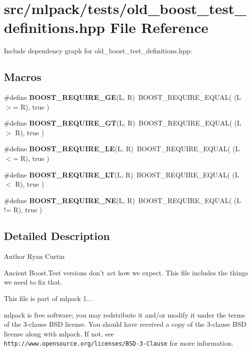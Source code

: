 \section{src/mlpack/tests/old\-\_\-boost\-\_\-test\-\_\-definitions.hpp File Reference}
\label{old__boost__test__definitions_8hpp}
Include dependency graph for old\-\_\-boost\-\_\-test\-\_\-definitions.\-hpp\-:
\subsection*{Macros}
\begin{DoxyCompactItemize}
\item 
\#define {\bf B\-O\-O\-S\-T\-\_\-\-R\-E\-Q\-U\-I\-R\-E\-\_\-\-G\-E}(L, R)~B\-O\-O\-S\-T\-\_\-\-R\-E\-Q\-U\-I\-R\-E\-\_\-\-E\-Q\-U\-A\-L( (L $>$= R), true )
\item 
\#define {\bf B\-O\-O\-S\-T\-\_\-\-R\-E\-Q\-U\-I\-R\-E\-\_\-\-G\-T}(L, R)~B\-O\-O\-S\-T\-\_\-\-R\-E\-Q\-U\-I\-R\-E\-\_\-\-E\-Q\-U\-A\-L( (L $>$ R), true )
\item 
\#define {\bf B\-O\-O\-S\-T\-\_\-\-R\-E\-Q\-U\-I\-R\-E\-\_\-\-L\-E}(L, R)~B\-O\-O\-S\-T\-\_\-\-R\-E\-Q\-U\-I\-R\-E\-\_\-\-E\-Q\-U\-A\-L( (L $<$= R), true )
\item 
\#define {\bf B\-O\-O\-S\-T\-\_\-\-R\-E\-Q\-U\-I\-R\-E\-\_\-\-L\-T}(L, R)~B\-O\-O\-S\-T\-\_\-\-R\-E\-Q\-U\-I\-R\-E\-\_\-\-E\-Q\-U\-A\-L( (L $<$ R), true )
\item 
\#define {\bf B\-O\-O\-S\-T\-\_\-\-R\-E\-Q\-U\-I\-R\-E\-\_\-\-N\-E}(L, R)~B\-O\-O\-S\-T\-\_\-\-R\-E\-Q\-U\-I\-R\-E\-\_\-\-E\-Q\-U\-A\-L( (L != R), true )
\end{DoxyCompactItemize}


\subsection{Detailed Description}
\begin{DoxyAuthor}{Author}
Ryan Curtin
\end{DoxyAuthor}
Ancient Boost.\-Test versions don't act how we expect. This file includes the things we need to fix that.

This file is part of mlpack 1...

mlpack is free software; you may redstribute it and/or modify it under the terms of the 3-\/clause B\-S\-D license. You should have received a copy of the 3-\/clause B\-S\-D license along with mlpack. If not, see {\tt http\-://www.\-opensource.\-org/licenses/\-B\-S\-D-\/3-\/\-Clause} for more information. 

